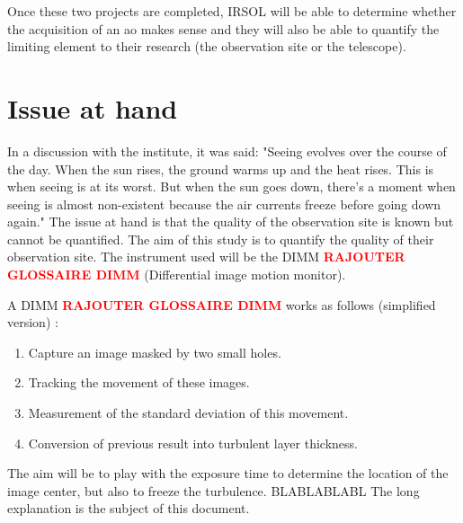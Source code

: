 Once these two projects are completed, IRSOL will be able to determine whether the acquisition of an \acrfull{ao} makes sense
and they will also be able to quantify the limiting element to their research (the observation site or the telescope).



\section{Issue at hand}
In a discussion with the institute, it was said: "Seeing evolves over the course of the day.
When the sun rises, the ground warms up and the heat rises. This is when seeing is at its worst.
But when the sun goes down, there's a moment when seeing is almost non-existent because the air currents freeze before going down again."
\bigbreak
The issue at hand is that the quality of the observation site is known but cannot be quantified.
The aim of this study is to quantify the quality of their observation site.
The instrument used will be the DIMM \textbf{\textcolor{red}{RAJOUTER GLOSSAIRE DIMM}} (Differential image motion monitor).

A DIMM \textbf{\textcolor{red}{RAJOUTER GLOSSAIRE DIMM}} works as follows (simplified version) :
\begin{enumerate}
    \item Capture an image masked by two small holes.
    \item Tracking the movement of these images.
    \item Measurement of the standard deviation of this movement.
    \item Conversion of previous result into turbulent layer thickness.
\end{enumerate}
The aim will be to play with the exposure time to determine the location of the image center, but also to freeze the turbulence.
\newline
BLABLABLABL
\newline
The long explanation is the subject of this document.

